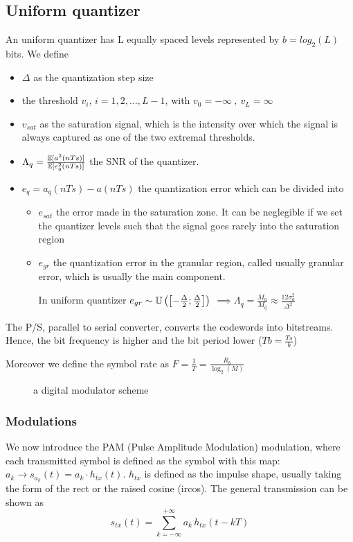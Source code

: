 \subsection{Uniform quantizer}
An uniform quantizer has L equally spaced levels represented by $b = log_2(L)$ bits. We define
\begin{itemize}
  \item $\Delta$ as the quantization step size
  \item the threshold $v_i$, $i = 1, 2, \dots, L - 1$, with $v_0 = -\infty \ ,\ v_L = \infty$
  \item $v_{sat}$ as the saturation signal, which is the intensity over which the signal is always captured as one of the two extremal thresholds.
  \item $\Lambda_q = \frac{\mathbb{E}[a^2(nTs)]}{\mathbb{E}[e_q^2(nTs)]}$ the SNR of the quantizer.
  \item $e_q = a_q(n Ts) - a(n Ts)$ the quantization error which can be divided into
  \begin{itemize}
    \item $e_{sat}$ the error made in the saturation zone. It can be neglegible if we set the quantizer levels such that the signal goes rarely into the saturation region
    \item $e_{gr}$ the quantization error in the granular region, called usually granular error, which is usually the main component.

    In uniform quantizer $e_{gr}\sim \mathbb{U}\left(\left[-\frac{\Delta}{2};\frac{\Delta}{2}\right]\right)$
    $\implies \Lambda_q = \frac{M_a}{M_q} \approx \frac{12 \sigma_a^2 }{\Delta^2}$
  \end{itemize}
\end{itemize}

The P/S, parallel to serial converter, converts the codewords into bitstreams. Hence, the bit frequency is higher and the bit period lower ($Tb = \frac{Ts}{b}$)

Moreover we define the symbol rate as $F=\frac{1}{T} = \frac{R_b}{\log_2(M)}$

\begin{figure}\centering
  
  \caption{a digital modulator scheme}
  \label{}
\end{figure}
\subsubsection{Modulations}
We now introduce the PAM (Pulse Amplitude Modulation) modulation, where each transmitted symbol is defined as the symbol with this map: $a_k \to s_{a_k} (t) = a_k \cdot h_{tx}(t)$. $h_{tx}$ is defined as the impulse shape, usually taking the form of the rect or the raised cosine (ircos).
The general transmission can be shown as
\begin{equation}
  s_{tx}(t) = \sum\limits_{k=-\infty}^{+\infty} a_k \, h_{tx}(t - kT)
\end{equation}


